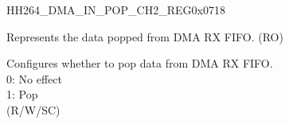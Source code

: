     
    \begin{register}{H}{H264\_DMA\_IN\_POP\_CH2\_REG}{0x0718}\label{regdesc:H264DMAINPOPCH2REG}
    \regnewline%
    \begin{regdesc}\begin{reglist}
    \label{fielddesc:H264DMAINFIFORDATACH2}\item [H264\_DMA\_INFIFO\_RDATA\_CH2] Represents the data popped from DMA RX FIFO. (RO)
    \label{fielddesc:H264DMAINFIFOPOPCH2}\item [H264\_DMA\_INFIFO\_POP\_CH2] Configures whether to pop data from DMA RX FIFO.\\
    0: No effect\\
    1: Pop\\ (R/W/SC)
    \end{reglist}\end{regdesc}
    \end{register}
    
